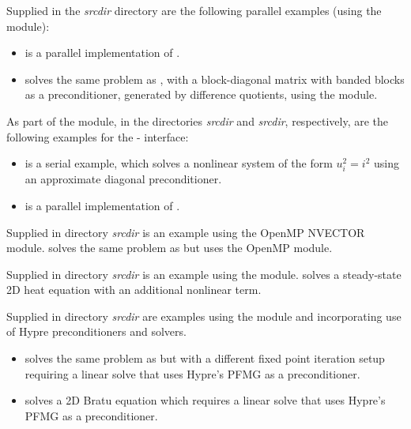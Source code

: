 \vspace{0.2in}\noindent
Supplied in the {\em srcdir} directory are
the following parallel examples (using the {\nvecp} module):
\begin{itemize}
\item {}
  is a parallel implementation of .
\item {}
  solves the same problem as , with a block-diagonal matrix
  with banded blocks as a preconditioner, generated by difference quotients,
  using the {\kinbbdpre} module.
\end{itemize}

\vspace{0.2in}\noindent
As part of the {\fkinsol} module, in the directories 
{\em srcdir} and
{\em srcdir}, respectively, are the
following examples for the {\F}-{\CC} interface:
\begin{itemize}
\item {}
  is a serial example, which solves a nonlinear system of the form
  $u_i^2 = i^2$ using an approximate diagonal preconditioner.
\item {}
  is a parallel implementation of .
\end{itemize}

\vspace{0.2in}\noindent
Supplied in directory {\em srcdir}
is an example using the OpenMP NVECTOR module.
 solves the same problem as
 but uses the OpenMP module.

\vspace{0.2in}\noindent
Supplied in directory {\em srcdir}
is an example using the {\nvecp} module.
 solves a steady-state 2D heat
equation with an additional nonlinear term. 

\vspace{0.2in}\noindent
Supplied in directory {\em srcdir}
are examples using the {\nvecp} module and incorporating use
of Hypre preconditioners and solvers.
\begin{itemize}
\item {}
  solves the same problem as  
  but with a different fixed point iteration setup requiring 
  a linear solve that uses Hypre's PFMG as a preconditioner. 
\item {}
  solves a 2D Bratu equation which requires a linear solve
  that uses Hypre's PFMG as a preconditioner.
\end{itemize}


